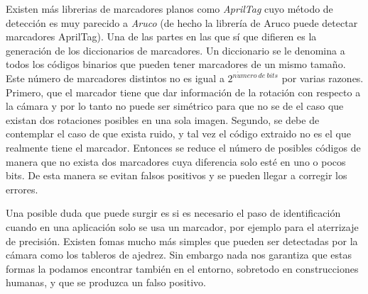Existen más librerias de marcadores planos como \textit{AprilTag} cuyo método de detección es muy parecido a \textit{Aruco} (de hecho la librería de Aruco puede detectar marcadores AprilTag). Una de las partes en las que sí que difieren es la generación de los diccionarios de marcadores. Un diccionario se le denomina a todos los códigos binarios que pueden tener marcadores de un mismo tamaño. Este número de marcadores distintos no es igual a $2^{n\acute{u}mero\ de\ bits}$ por varias razones. Primero, que el marcador tiene que dar información de la rotación con respecto a la cámara y por lo tanto no puede ser simétrico para que no se de el caso que existan dos rotaciones posibles en una sola imagen. Segundo, se debe de contemplar el caso de que exista ruido, y tal vez el código extraido no es el que realmente tiene el marcador. Entonces se reduce el número de posibles códigos de manera que no exista dos marcadores cuya diferencia solo esté en uno o pocos bits. De esta manera se evitan falsos positivos y se pueden llegar a corregir los errores. 

Una posible duda que puede surgir es si es necesario el paso de identificación cuando en una aplicación solo se usa un marcador, por ejemplo para el aterrizaje de precisión. Existen fomas mucho más simples que pueden ser detectadas por la cámara como los tableros de ajedrez. Sin embargo nada nos garantiza que estas formas la podamos encontrar también en el entorno, sobretodo en construcciones humanas, y que se produzca un falso positivo.

